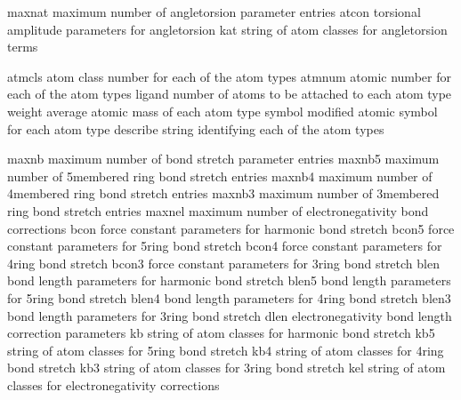 \documentclass[letterpaper,11pt,english]{sphinxmanual}
\begin{document}
\sphinxAtStartPar
{}

\begin{sphinxVerbatim}[commandchars=\\\{\}]
maxnat          maximum number of angle\PYGZhy{}torsion parameter entries
atcon           torsional amplitude parameters for angle\PYGZhy{}torsion
kat             string of atom classes for angle\PYGZhy{}torsion terms
\end{sphinxVerbatim}

\sphinxAtStartPar
{}

\begin{sphinxVerbatim}[commandchars=\\\{\}]
atmcls          atom class number for each of the atom types
atmnum          atomic number for each of the atom types
ligand          number of atoms to be attached to each atom type
weight          average atomic mass of each atom type
symbol          modified atomic symbol for each atom type
describe        string identifying each of the atom types
\end{sphinxVerbatim}

\sphinxAtStartPar
{}

\begin{sphinxVerbatim}[commandchars=\\\{\}]
maxnb           maximum number of bond stretch parameter entries
maxnb5          maximum number of 5\PYGZhy{}membered ring bond stretch entries
maxnb4          maximum number of 4\PYGZhy{}membered ring bond stretch entries
maxnb3          maximum number of 3\PYGZhy{}membered ring bond stretch entries
maxnel          maximum number of electronegativity bond corrections
bcon            force constant parameters for harmonic bond stretch
bcon5           force constant parameters for 5\PYGZhy{}ring bond stretch
bcon4           force constant parameters for 4\PYGZhy{}ring bond stretch
bcon3           force constant parameters for 3\PYGZhy{}ring bond stretch
blen            bond length parameters for harmonic bond stretch
blen5           bond length parameters for 5\PYGZhy{}ring bond stretch
blen4           bond length parameters for 4\PYGZhy{}ring bond stretch
blen3           bond length parameters for 3\PYGZhy{}ring bond stretch
dlen            electronegativity bond length correction parameters
kb              string of atom classes for harmonic bond stretch
kb5             string of atom classes for 5\PYGZhy{}ring bond stretch
kb4             string of atom classes for 4\PYGZhy{}ring bond stretch
kb3             string of atom classes for 3\PYGZhy{}ring bond stretch
kel             string of atom classes for electronegativity corrections
\end{sphinxVerbatim}
\end{document}
